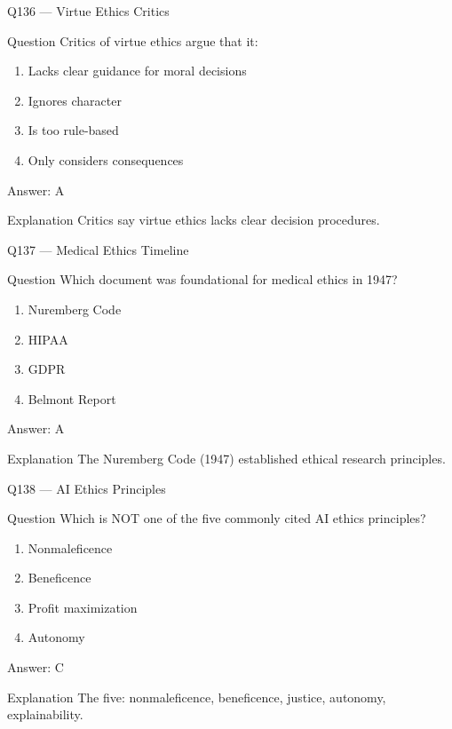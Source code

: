 \documentclass[aspectratio=169,8pt]{beamer}
\begin{document}
	\begin{frame}{Q136 --- Virtue Ethics Critics}
		\begin{block}{Question}
			Critics of virtue ethics argue that it:
		\end{block}
		\begin{enumerate}
			\item Lacks clear guidance for moral decisions
			\item Ignores character
			\item Is too rule-based
			\item Only considers consequences
		\end{enumerate}
		\begin{exampleblock}{Answer: A}\end{exampleblock}
		\begin{block}{Explanation}
			Critics say virtue ethics lacks clear decision procedures.
		\end{block}
	\end{frame}
	
	\begin{frame}{Q137 --- Medical Ethics Timeline}
		\begin{block}{Question}
			Which document was foundational for medical ethics in 1947?
		\end{block}
		\begin{enumerate}
			\item Nuremberg Code
			\item HIPAA
			\item GDPR
			\item Belmont Report
		\end{enumerate}
		\begin{exampleblock}{Answer: A}\end{exampleblock}
		\begin{block}{Explanation}
			The Nuremberg Code (1947) established ethical research principles.
		\end{block}
	\end{frame}
	
	\begin{frame}{Q138 --- AI Ethics Principles}
		\begin{block}{Question}
			Which is NOT one of the five commonly cited AI ethics principles?
		\end{block}
		\begin{enumerate}
			\item Nonmaleficence
			\item Beneficence
			\item Profit maximization
			\item Autonomy
		\end{enumerate}
		\begin{exampleblock}{Answer: C}\end{exampleblock}
		\begin{block}{Explanation}
			The five: nonmaleficence, beneficence, justice, autonomy, explainability.
		\end{block}
	\end{frame}
	
\end{document}
